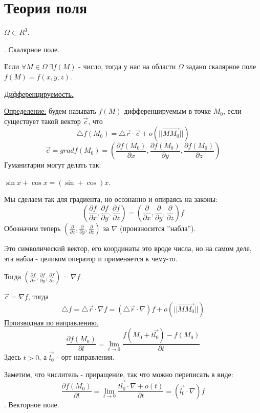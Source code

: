 \documentclass[12pt]{article}
\begin{document}
\section{Теория поля}
$\Omega \subset R^3$.\par
{}. Скалярное поле.\par
Если $\forall M \in \Omega \ \exists f(M)$ - число, тогда у нас на области $\Omega$ задано скалярное поле $f(M) = f(x,y,z)$.\par
\uline{Дифференцируемость.}\par
\uline{Определение:} будем называть $f(M)$ дифференцируемым в точке $M_0$, если существует такой вектор $\overrightarrow{c}$, что
$${\bigtriangleup f}(M_0) = {\bigtriangleup \overrightarrow{r}} \cdot \overrightarrow{c} + o(||\overrightarrow{MM_0}||)$$
$$\overrightarrow{c} = grad f(M_0) = (\frac{\partial f(M_0)}{\partial x}, \frac{\partial f(M_0)}{\partial y}, \frac{\partial f(M_0)}{\partial z})$$
Гуманитарии могут делать так:\par
$\sin x + \cos x = (\sin+\cos)x$.\par
Мы сделаем так для градиента, но осознанно и опираясь на законы:
$$(\frac{\partial f}{\partial x},\frac{\partial f}{\partial y}, \frac{\partial f}{\partial z}) = (\frac{\partial}{\partial x},\frac{\partial}{\partial y},\frac{\partial}{\partial z})f$$
Обозначим теперь $(\frac{\partial}{\partial x},\frac{\partial}{\partial y},\frac{\partial}{\partial z})$ за $\nabla$ (произносится ''набла'').\par
Это символический вектор, его координаты это вроде числа, но на самом деле, эта набла - целиком оператор и применяется к чему-то.\par
Тогда $(\frac{\partial f}{\partial x},\frac{\partial f}{\partial y}, \frac{\partial f}{\partial z}) = {\nabla f}$.\par
$\overrightarrow{c} = {\nabla f}$, тогда
$${\bigtriangleup f} = {\bigtriangleup \overrightarrow{r}} \cdot {\nabla f} = ({\bigtriangleup \overrightarrow{r}} \cdot {\nabla})f + o(||\overrightarrow{MM_0}||)$$
\uline{Производная по направлению.}
$$\frac{\partial f (M_0)}{\partial l} = \lim_{t\to 0} \frac{f(M_0+t\overrightarrow{l_0})-f(M_0)}{\partial t}$$
Здесь $t > 0$, а $\overrightarrow{l_0}$ - орт направления.\par
Заметим, что числитель - приращение, так что можно переписать в виде:
$$\frac{\partial f (M_0)}{\partial l} = \lim_{t\to 0} \frac{t \overrightarrow{l_0} \cdot \nabla + o(t)}{\partial t} = (\overrightarrow{l_0} \cdot \nabla)f$$
. Векторное поле.\par
\end{document}
